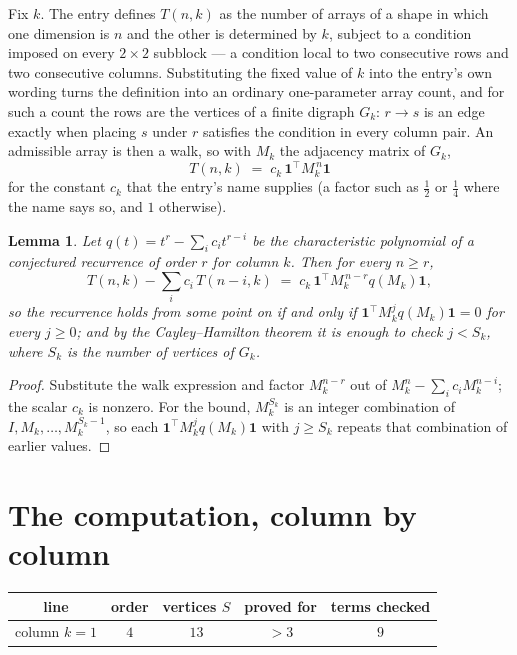 \documentclass[11pt,a4paper]{article}
\theoremstyle{plain}
\newtheorem{lemma}[theorem]{Lemma}
\theoremstyle{definition}
\begin{document}
Fix $k$. The entry defines $T(n,k)$ as the number of arrays of a shape in which one dimension
is $n$ and the other is determined by $k$, subject to a condition imposed on every
$2\times2$ subblock --- a condition local to two consecutive rows and two consecutive columns.
Substituting the fixed value of $k$ into the entry's own wording turns the definition into an
ordinary one-parameter array count, and for such a count the rows are the vertices of a finite
digraph $G_k$: $r\to s$ is an edge exactly when placing $s$ under $r$ satisfies the condition
in every column pair. An admissible array is then a walk, so with $M_k$ the adjacency matrix
of $G_k$,
\[
T(n,k)\;=\;c_k\,\mathbf{1}^{\!\top}M_k^{\,n}\mathbf{1}
\]
for the constant $c_k$ that the entry's name supplies (a factor such as $\tfrac12$ or
$\tfrac14$ where the name says so, and $1$ otherwise).

\begin{lemma}\label{lem:crit}
Let $q(t)=t^{r}-\sum_i c_it^{r-i}$ be the characteristic polynomial of a conjectured
recurrence of order $r$ for column $k$. Then for every $n\ge r$,
\[
T(n,k)-\sum_i c_i\,T(n-i,k)\;=\;c_k\,\mathbf{1}^{\!\top}M_k^{\,n-r}q(M_k)\mathbf{1},
\]
so the recurrence holds from some point on if and only if
$\mathbf{1}^{\!\top}M_k^{j}q(M_k)\mathbf{1}=0$ for every $j\ge0$; and by the
Cayley--Hamilton theorem it is enough to check $j<S_k$, where $S_k$ is the number of vertices
of $G_k$.
\end{lemma}

\begin{proof}
Substitute the walk expression and factor $M_k^{n-r}$ out of $M_k^{n}-\sum_ic_iM_k^{n-i}$;
the scalar $c_k$ is nonzero. For the bound, $M_k^{S_k}$ is an integer combination of
$I,M_k,\dots,M_k^{S_k-1}$, so each $\mathbf{1}^{\!\top}M_k^{j}q(M_k)\mathbf{1}$ with
$j\ge S_k$ repeats that combination of earlier values.
\end{proof}

\section{The computation, column by column}

\begin{center}
\begin{tabular}{ccccc}
line & order & vertices $S$ & proved for & terms checked \\ \hline
column $k$$=1$ & $4$ & $13$ & $>3$ & $9$ \\
\end{tabular}
\end{center}
\end{document}
